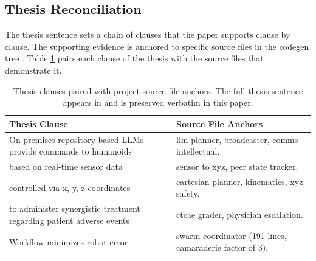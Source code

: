%
%

\begin{sectionaccent}

\subsection{Thesis Reconciliation}
\label{sec:discussion-thesis}

The thesis sentence sets a chain of clauses that the paper supports
clause by clause. The supporting evidence is anchored to specific
source files in the codegen tree
\cite{kawchak_2026_humanoid_instructions}. Table
\ref{tbl:thesis-anchors} pairs each clause of the thesis with the
source files that demonstrate it.

\begin{table}[H]
\captionsetup{type=table}
\caption{Thesis clauses paired with project source file anchors. The
full thesis sentence appears in
 and is preserved verbatim in this
paper.}
\label{tbl:thesis-anchors}
\small
\begin{tabular}{>{\raggedright\arraybackslash}p{6cm}
                >{\raggedright\arraybackslash}p{9cm}}
\toprule
\textbf{Thesis Clause} & \textbf{Source File Anchors} \\
\midrule
On-premises repository based LLMs provide commands to humanoids & llm planner, broadcaster, comms intellectual. \\
based on real-time sensor data & sensor to xyz, peer state tracker. \\
controlled via x, y, z coordinates & cartesian planner, kinematics, xyz safety. \\
to administer synergistic treatment regarding patient adverse events & ctcae grader, physician escalation. \\
Workflow minimizes robot error & swarm coordinator (191 lines, camaraderie factor of 3). \\
\bottomrule
\end{tabular}
\end{table}


\end{sectionaccent}
